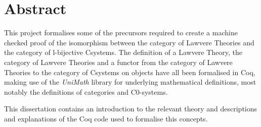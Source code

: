 \chapter*{\centering Abstract}
This project formalises some of the precursors required to create a machine
checked proof of the isomorphism between the category of Lawvere Theories and
the category of l-bijective Csystems. The definition of a Lawvere Theory, the
category of Lawvere Theories and a functor from the category of Lawvere Theories
to the category of Csystems on objects have all been formalised in Coq, making
use of the \textit{UniMath} library for underlying mathematical definitions,
most notably the definitions of categories and C0-systems.

This dissertation contains an introduction to the relevant theory and
descriptions and explanations of the Coq code used to formalise this concepts.
